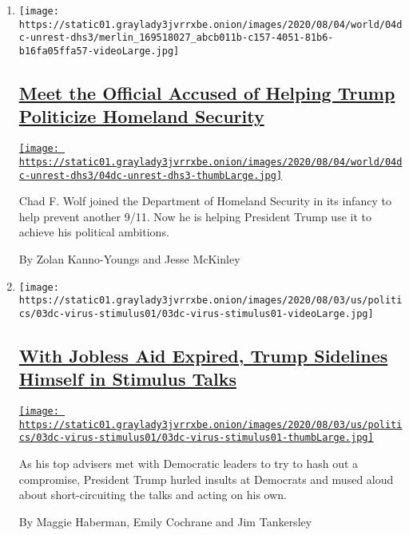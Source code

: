 \begin{enumerate}
\def\labelenumi{\arabic{enumi}.}
\item
  \texttt{[image: https://static01.graylady3jvrrxbe.onion/images/2020/08/04/world/04dc-unrest-dhs3/merlin\_169518027\_abcb011b-c157-4051-81b6-b16fa05ffa57-videoLarge.jpg]}

  \hypertarget{meet-the-official-accused-of-helping-trump-politicize-homeland-security}{%
  \subsection{\texorpdfstring{\href{/2020/08/04/us/politics/trump-homeland-security.html}{Meet
  the Official Accused of Helping Trump Politicize Homeland
  Security}}{Meet the Official Accused of Helping Trump Politicize Homeland Security}}\label{meet-the-official-accused-of-helping-trump-politicize-homeland-security}}

  \href{/2020/08/04/us/politics/trump-homeland-security.html}{\texttt{[image: https://static01.graylady3jvrrxbe.onion/images/2020/08/04/world/04dc-unrest-dhs3/04dc-unrest-dhs3-thumbLarge.jpg]}}

  Chad F. Wolf joined the Department of Homeland Security in its infancy
  to help prevent another 9/11. Now he is helping President Trump use it
  to achieve his political ambitions.

  By Zolan Kanno-Youngs and Jesse McKinley
\item
  \texttt{[image: https://static01.graylady3jvrrxbe.onion/images/2020/08/03/us/politics/03dc-virus-stimulus01/03dc-virus-stimulus01-videoLarge.jpg]}

  \hypertarget{with-jobless-aid-expired-trump-sidelines-himself-in-stimulus-talks}{%
  \subsection{\texorpdfstring{\href{/2020/08/03/us/politics/congress-jobless-aid-talks-trump.html}{With
  Jobless Aid Expired, Trump Sidelines Himself in Stimulus
  Talks}}{With Jobless Aid Expired, Trump Sidelines Himself in Stimulus Talks}}\label{with-jobless-aid-expired-trump-sidelines-himself-in-stimulus-talks}}

  \href{/2020/08/03/us/politics/congress-jobless-aid-talks-trump.html}{\texttt{[image: https://static01.graylady3jvrrxbe.onion/images/2020/08/03/us/politics/03dc-virus-stimulus01/03dc-virus-stimulus01-thumbLarge.jpg]}}

  As his top advisers met with Democratic leaders to try to hash out a
  compromise, President Trump hurled insults at Democrats and mused
  aloud about short-circuiting the talks and acting on his own.

  By Maggie Haberman, Emily Cochrane and Jim Tankersley
\end{enumerate}

